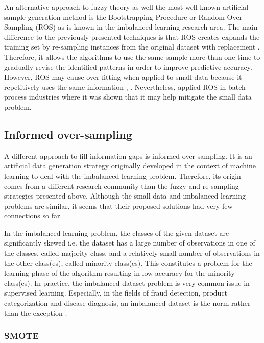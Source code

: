 \documentclass[parskip=full]{scrartcl}
\begin{document}
An alternative approach to fuzzy theory as well the most well-known artificial
sample generation method is the Bootstrapping Procedure \cite{AbdulLateh.2017}
or Random Over-Sampling (ROS) as is known in the imbalanced learning research
area. The main difference to the previously presented techniques is that ROS
creates expands the training set by re-sampling instances from the original
dataset with replacement \cite{Efron.1993}. Therefore, it allows the algorithms
to use the same sample more than one time to gradually revise the identified
patterns in order to improve predictive accuracy. However, ROS may cause
over-fitting when applied to small data because it repetitively uses the same
information \cite{Tsai.2015}, \cite{Li.2018}. Nevertheless, \cite{Ivanescu.2006}
applied ROS in batch process industries where it was shown that it may help
mitigate the small data problem.

\subsection{Informed over-sampling}

A different approach to fill information gaps is informed over-sampling. It is
an artificial data generation strategy originally developed in the context of
machine learning to deal with the imbalanced learning problem. Therefore, its
origin comes from a different research community than the fuzzy and re-sampling
strategies presented above. Although the small data and imbalanced learning
problems are similar, it seems that their proposed solutions had very few
connections so far.

In the imbalanced learning problem, the classes of the given dataset are
significantly skewed i.e. the dataset has a large number of observations in one
of the classes, called majority class, and a relatively small number of
observations in the other class(es), called minority class(es). This constitutes
a problem for the learning phase of the algorithm resulting in low accuracy for
the minority class(es). In practice, the imbalanced dataset problem is very
common issue in supervised learning. Especially, in the fields of fraud
detection, product categorization and disease diagnosis, an imbalanced dataset
is the norm rather than the exception \cite{He.2013}.

\subsubsection{SMOTE}
\end{document}
